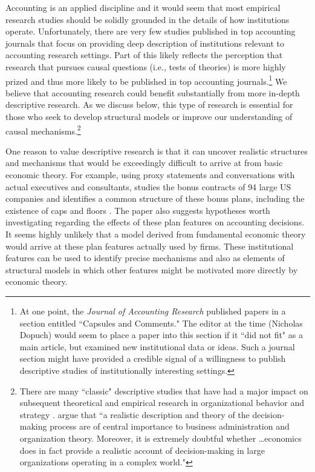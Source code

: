\documentclass[12pt,reqno,titlepage]{amsart}
\begin{document}
\begin{doublespace}
Accounting is an applied discipline and it would seem that most empirical research studies should be solidly grounded in the details of how institutions operate.
Unfortunately, there are very few studies published in top accounting journals that focus on providing deep description of institutions relevant to accounting research settings.
Part of this likely reflects the perception that research that pursues causal questions (i.e., tests of theories) is more highly prized and thus more likely to be published in top accounting journals.\footnote{
At one point, the \emph{Journal of Accounting Research} published papers in a section entitled ``Capsules and Comments."
The editor at the time (Nicholas Dopuch) would seem to place a paper into this section if it ``did not fit" as a main article, but examined new institutional data or ideas. 
Such a journal section might have provided a credible signal of a willingness to publish descriptive studies of institutionally interesting settings.}
We believe that accounting research could benefit substantially from more in-depth descriptive research.
As we discuss below, this type of research is essential for those who seek to develop structural models or improve our understanding of causal mechanisms.\footnote{
There are many ``classic" descriptive studies that have had a major impact on subsequent theoretical and empirical research in organizational behavior and strategy \citep[e.g.,][]{Cyert:1956fd,Bower:1986vd,Mintzberg1973nature}.
\citet{Cyert:1956fd} argue that ``a realistic description and theory of the decision-making process are of central importance to business administration and organization theory. Moreover, it is extremely doubtful whether \dots economics does in fact provide a realistic account of decision-making in large organizations operating in a complex world."}

One reason to value descriptive research is that it can uncover realistic structures and mechanisms that would be exceedingly difficult to arrive at from basic economic theory.
For example, using proxy statements and conversations with actual executives and consultants, \citet{Healy:1985jg} studies the bonus contracts of 94 large US companies and identifies a common structure of these bonus plans, including the existence of caps and floors \citep[p.\,89]{Healy:1985jg}. The paper also suggests hypotheses worth investigating regarding the effects of these plan features on accounting decisions.
It seems highly unlikely that a model derived from fundamental economic theory would arrive at these plan features actually used by firms.
These institutional features can be used to identify precise mechanisms and also as elements of structural models in which other features might be motivated more directly by economic theory.


\end{doublespace}
\end{document}
